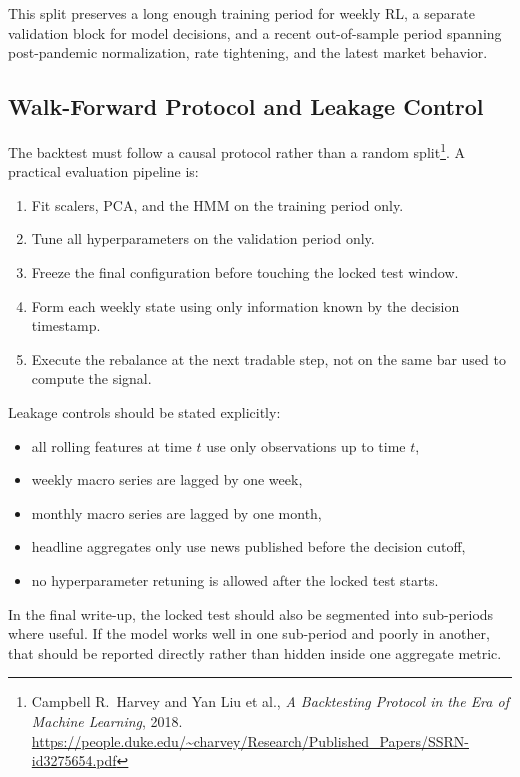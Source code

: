 \documentclass[11pt,a4paper]{article}
\newcommand{\fncite}[2]{\footnote{#1. \url{#2}}}
\begin{document}
This split preserves a long enough training period for weekly RL, a separate validation block for model decisions, and a recent out-of-sample period spanning post-pandemic normalization, rate tightening, and the latest market behavior.

\subsection{Walk-Forward Protocol and Leakage Control}

The backtest must follow a causal protocol rather than a random split\fncite{Campbell R.~Harvey and Yan Liu et al., \emph{A Backtesting Protocol in the Era of Machine Learning}, 2018}{https://people.duke.edu/~charvey/Research/Published_Papers/SSRN-id3275654.pdf}. A practical evaluation pipeline is:

\begin{enumerate}[leftmargin=1.5em]
  \item Fit scalers, PCA, and the HMM on the training period only.
  \item Tune all hyperparameters on the validation period only.
  \item Freeze the final configuration before touching the locked test window.
  \item Form each weekly state using only information known by the decision timestamp.
  \item Execute the rebalance at the next tradable step, not on the same bar used to compute the signal.
\end{enumerate}

Leakage controls should be stated explicitly:

\begin{itemize}[leftmargin=1.4em]
  \item all rolling features at time $t$ use only observations up to time $t$,
  \item weekly macro series are lagged by one week,
  \item monthly macro series are lagged by one month,
  \item headline aggregates only use news published before the decision cutoff,
  \item no hyperparameter retuning is allowed after the locked test starts.
\end{itemize}

In the final write-up, the locked test should also be segmented into sub-periods where useful.
If the model works well in one sub-period and poorly in another, that should be reported directly rather than hidden inside one aggregate metric.
\end{document}
